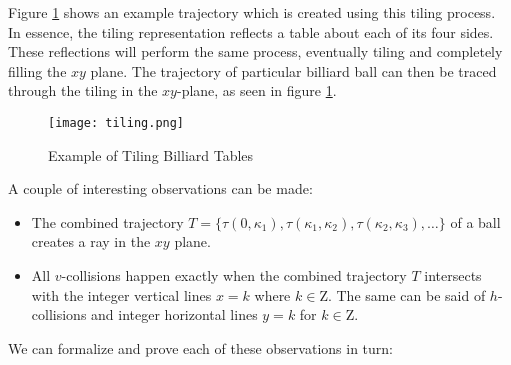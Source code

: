 Figure \ref{fig:tiling} shows an example trajectory which is created using this tiling process. In essence, the tiling representation reflects a table about each of its four sides. These reflections will perform the same process, eventually tiling and completely filling the $xy$ plane. The trajectory of particular billiard ball can then be traced through the tiling in the $xy$-plane, as seen in figure \ref{fig:tiling}.

\begin{figure}
  \texttt{[image: tiling.png]}
  \caption{\label{fig:tiling}Example of Tiling Billiard Tables}
\end{figure}

A couple of interesting observations can be made:

\begin{itemize}
  \item The combined trajectory $T = \{\tau(0, \kappa_1), \tau(\kappa_1, \kappa_2), \tau(\kappa_2, \kappa_3), \ldots \}$ of a ball creates a ray in the $xy$ plane.
  \item All $v$-collisions happen exactly when the combined trajectory $T$ intersects with the integer vertical lines $x = k$ where $k \in \mathrm{Z}$. The same can be said of $h$-collisions and integer horizontal lines $y = k$ for $k \in \mathrm{Z}$.
\end{itemize}

We can formalize and prove each of these observations in turn:

